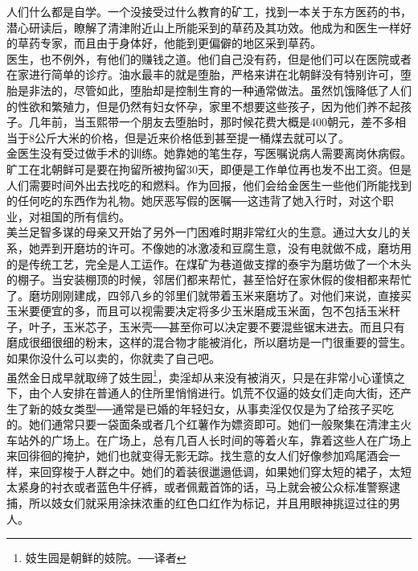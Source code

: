 人们什么都是自学。一个没接受过什么教育的矿工，找到一本关于东方医药的书，潜心研读后，瞭解了清津附近山上所能采到的草药及其功效。他成为和医生一样好的草药专家，而且由于身体好，他能到更偏僻的地区采到草药。\\

医生，也不例外，有他们的赚钱之道。他们自己没有药，但是他们可以在医院或者在家进行简单的诊疗。油水最丰的就是堕胎，严格来讲在北朝鲜没有特别许可，堕胎是非法的，尽管如此，堕胎却是控制生育的一种通常做法。虽然饥饿降低了人们的性欲和繁殖力，但是仍然有妇女怀孕，家里不想要这些孩子，因为他们养不起孩子。几年前，当玉熙带一个朋友去堕胎时，那时候花费大概是400朝元，差不多相当于8公斤大米的价格，但是近来价格低到甚至提一桶煤去就可以了。\\

金医生没有受过做手术的训练。她靠她的笔生存，写医嘱说病人需要离岗休病假。旷工在北朝鲜可是要在拘留所被拘留30天，即便是工作单位再也发不出工资。但是人们需要时间外出去找吃的和燃料。作为回报，他们会给金医生一些他们所能找到的任何吃的东西作为礼物。她厌恶写假的医嘱──这违背了她入行时，对这个职业，对祖国的所有信约。\\

美兰足智多谋的母亲又开始了另外一门困难时期非常红火的生意。通过大女儿的关系，她弄到开磨坊的许可。不像她的冰激凌和豆腐生意，没有电就做不成，磨坊用的是传统工艺，完全是人工运作。在煤矿为巷道做支撑的泰宇为磨坊做了一个木头的棚子。当安装棚顶的时候，邻居们都来帮忙，甚至恰好在家休假的俊相都来帮忙了。磨坊刚刚建成，四邻八乡的邻里们就带着玉米来磨坊了。对他们来说，直接买玉米要便宜的多，而且可以视需要决定将多少玉米磨成玉米面，包不包括玉米秆子，叶子，玉米芯子，玉米壳──甚至你可以决定要不要混些锯末进去。而且只有磨成很细很细的粉末，这样的混合物才能被消化，所以磨坊是一门很重要的营生。\\

如果你没什么可以卖的，你就卖了自己吧。\\

虽然金日成早就取缔了妓生园\footnote{妓生园是朝鲜的妓院。──译者}，卖淫却从来没有被消灭，只是在非常小心谨慎之下，由个人安排在普通人的住所里悄悄进行。饥荒不仅逼的妓女们走向大街，还产生了新的妓女类型──通常是已婚的年轻妇女，从事卖淫仅仅是为了给孩子买吃的。她们通常只要一袋面条或者几个红薯作为嫖资即可。她们一般聚集在清津主火车站外的广场上。在广场上，总有几百人长时间的等着火车，靠着这些人在广场上来回徘徊的掩护，她们也就变得无影无踪。找生意的女人们好像参加鸡尾酒会一样，来回穿梭于人群之中。她们的着装很邋遢低调，如果她们穿太短的裙子，太短太紧身的衬衣或者蓝色牛仔裤，或者佩戴首饰的话，马上就会被公众标准警察逮捕，所以妓女们就采用涂抹浓重的红色口红作为标记，并且用眼神挑逗过往的男人。\\

